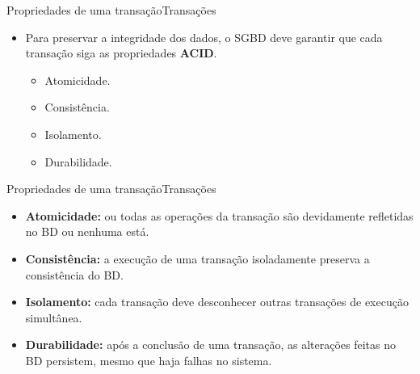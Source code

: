 \documentclass[t]{beamer}
\begin{document}

\begin{ftst}{Propriedades de uma transação}{Transações}

\begin{itemize}
    \item Para preservar a integridade dos dados, o SGBD deve garantir que cada transação siga as propriedades \textbf{ACID}.
    \vone
    \begin{itemize}
        \item Atomicidade.
        \item Consistência.
        \item Isolamento.
        \item Durabilidade.
    \end{itemize}
\end{itemize}

\end{ftst}


\begin{ftst}{Propriedades de uma transação}{Transações}

\begin{itemize}
    \item \textbf{Atomicidade:} ou todas as operações da transação são devidamente refletidas no BD ou nenhuma está.
    \item \textbf{Consistência:} a execução de uma transação isoladamente preserva a consistência do BD.
    \item \textbf{Isolamento:} cada transação deve desconhecer outras transações de execução simultânea.
    \item \textbf{Durabilidade:} após a conclusão de uma transação, as alterações feitas no BD persistem, mesmo que haja falhas no sistema.
\end{itemize}

\end{ftst}

\end{document}
